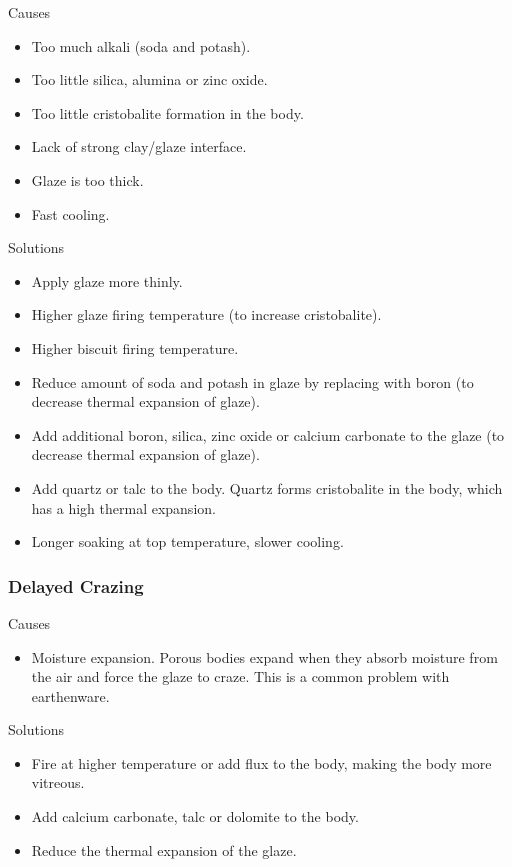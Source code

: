 Causes
\begin{itemize}
\item Too much alkali (soda and potash).
\item Too little silica, alumina or zinc oxide.
\item Too little cristobalite formation in the body.
\item Lack of strong clay/glaze interface.
\item Glaze is too thick.
\item Fast cooling.
\end{itemize}
Solutions
\begin{itemize}
\item Apply glaze more thinly.
\item Higher glaze firing temperature (to increase cristobalite).
\item Higher biscuit firing temperature.
\item Reduce amount of soda and potash in glaze by replacing with boron (to 
decrease thermal expansion of glaze).
\item Add additional boron, silica, zinc oxide or calcium carbonate to the 
glaze 
(to decrease thermal expansion of glaze).
\item Add quartz or talc to the body. Quartz forms cristobalite in the body, 
which 
has a high thermal expansion.
\item Longer soaking at top temperature, slower cooling.
\end{itemize}
\subsubsection{Delayed Crazing}
Causes
\begin{itemize}
\item Moisture expansion. Porous bodies expand when they absorb moisture from 
the 
air and force the glaze to craze. This is a common problem with earthenware.
\end{itemize}
Solutions
\begin{itemize}
\item Fire at higher temperature or add flux to the body, making the body more 
vitreous.
\item Add calcium carbonate, talc or dolomite to the body.
\item Reduce the thermal expansion of the glaze.
\end{itemize}
